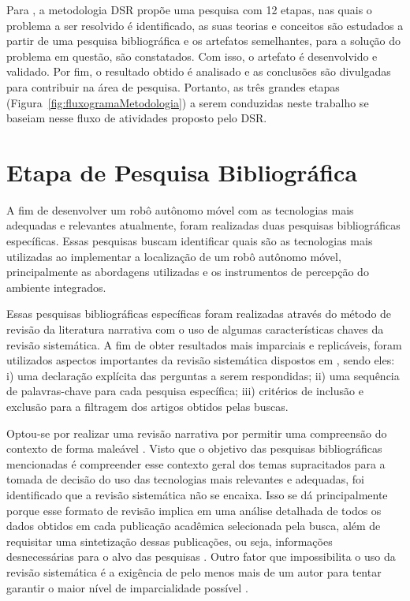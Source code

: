 Para \citet{dsrBook:2015}, a metodologia DSR propõe uma pesquisa com 12 etapas, nas quais o problema a ser resolvido é identificado, as suas teorias e conceitos são estudados a partir de uma pesquisa bibliográfica e os artefatos semelhantes, para a solução do problema em questão, são constatados. Com isso, o artefato é desenvolvido e validado. Por fim, o resultado obtido é analisado e as conclusões são divulgadas para contribuir na área de pesquisa. Portanto, as três grandes etapas (Figura~\ref{fig:fluxogramaMetodologia}) a serem conduzidas neste trabalho se baseiam nesse fluxo de atividades proposto pelo DSR.

\section{Etapa de Pesquisa Bibliográfica}
A fim de desenvolver um robô autônomo móvel com as tecnologias mais adequadas e relevantes atualmente, foram realizadas duas pesquisas bibliográficas específicas. Essas pesquisas buscam identificar quais são as tecnologias mais utilizadas ao implementar a localização de um robô autônomo móvel, principalmente as abordagens utilizadas e os instrumentos de percepção do ambiente integrados.

Essas pesquisas bibliográficas específicas foram realizadas através do método de revisão da literatura narrativa com o uso de algumas características chaves da revisão sistemática. A fim de obter resultados mais imparciais e replicáveis, foram utilizados aspectos importantes da revisão sistemática dispostos em \citet{revisaoSistematica}, sendo eles: i) uma declaração explícita das perguntas a serem respondidas; ii) uma sequência de palavras-chave para cada pesquisa específica; iii) critérios de inclusão e exclusão para a filtragem dos artigos obtidos pelas buscas. 

Optou-se por realizar uma revisão narrativa por permitir uma compreensão do contexto de forma maleável \cite{revisaoNarrativa}. Visto que o objetivo das pesquisas bibliográficas mencionadas é compreender esse contexto geral dos temas supracitados para a tomada de decisão do uso das tecnologias mais relevantes e adequadas, foi identificado que a revisão sistemática não se encaixa. Isso se dá principalmente porque esse formato de revisão implica em uma análise detalhada de todos os dados obtidos em cada publicação acadêmica selecionada pela busca, além de requisitar uma sintetização dessas publicações, ou seja, informações desnecessárias para o alvo das pesquisas \cite{revisaoSistematica, literaturas}. Outro fator que impossibilita o uso da revisão sistemática é a exigência de pelo menos mais de um autor para tentar garantir o maior nível de imparcialidade possível \cite{revisaoSistematica, literaturas}.

